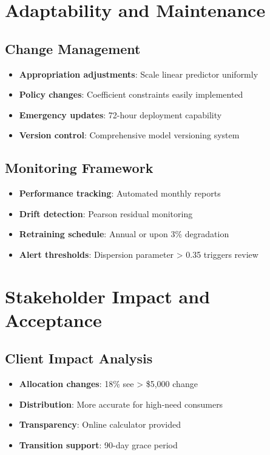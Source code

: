 \section{Adaptability and Maintenance}

\subsection{Change Management}

\begin{itemize}
    \item \textbf{Appropriation adjustments}: Scale linear predictor uniformly
    \item \textbf{Policy changes}: Coefficient constraints easily implemented
    \item \textbf{Emergency updates}: 72-hour deployment capability
    \item \textbf{Version control}: Comprehensive model versioning system
\end{itemize}

\subsection{Monitoring Framework}

\begin{itemize}
    \item \textbf{Performance tracking}: Automated monthly reports
    \item \textbf{Drift detection}: Pearson residual monitoring
    \item \textbf{Retraining schedule}: Annual or upon 3\% degradation
    \item \textbf{Alert thresholds}: Dispersion parameter > 0.35 triggers review
\end{itemize}

\section{Stakeholder Impact and Acceptance}

\subsection{Client Impact Analysis}

\begin{itemize}
    \item \textbf{Allocation changes}: 18\% see > \$5,000 change
    \item \textbf{Distribution}: More accurate for high-need consumers
    \item \textbf{Transparency}: Online calculator provided
    \item \textbf{Transition support}: 90-day grace period
\end{itemize}

